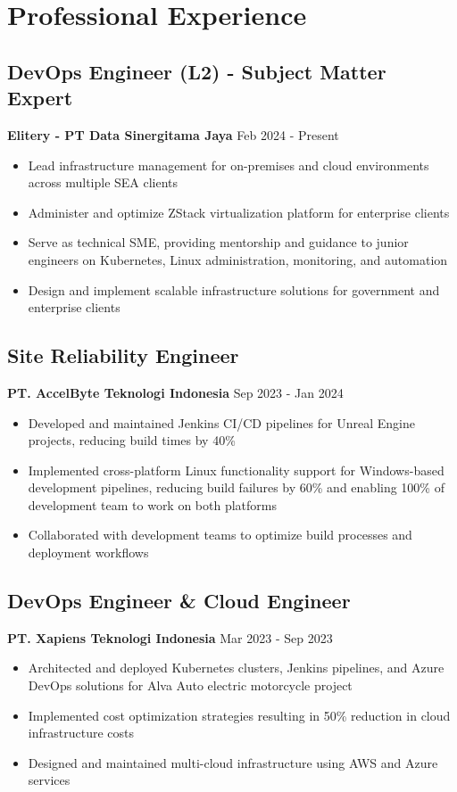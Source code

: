 \documentclass[11pt,a4paper]{article}
\newcommand{\company}[1]{\textbf{\color{primary}#1}}
\newcommand{\daterange}[1]{\color{secondary}#1}  %
\begin{document}
\section{Professional Experience}

\subsection{DevOps Engineer (L2) - Subject Matter Expert}
\company{Elitery - PT Data Sinergitama Jaya} \hfill \daterange{Feb 2024 - Present}
\begin{itemize}[leftmargin=*, itemsep=2pt]
    \item Lead infrastructure management for on-premises and cloud environments across multiple SEA clients
    \item Administer and optimize ZStack virtualization platform for enterprise clients
    \item Serve as technical SME, providing mentorship and guidance to junior engineers on Kubernetes, Linux administration, monitoring, and automation
    \item Design and implement scalable infrastructure solutions for government and enterprise clients
\end{itemize}

\subsection{Site Reliability Engineer}
\company{PT. AccelByte Teknologi Indonesia} \hfill \daterange{Sep 2023 - Jan 2024}
\begin{itemize}[leftmargin=*, itemsep=2pt]
    \item Developed and maintained Jenkins CI/CD pipelines for Unreal Engine projects, reducing build times by 40\%
            \item Implemented cross-platform Linux functionality support for Windows-based development pipelines, reducing build failures by 60\% and enabling 100\% of development team to work on both platforms
    \item Collaborated with development teams to optimize build processes and deployment workflows
\end{itemize}

\subsection{DevOps Engineer \& Cloud Engineer}
\company{PT. Xapiens Teknologi Indonesia} \hfill \daterange{Mar 2023 - Sep 2023}
\begin{itemize}[leftmargin=*, itemsep=2pt]
    \item Architected and deployed Kubernetes clusters, Jenkins pipelines, and Azure DevOps solutions for Alva Auto electric motorcycle project
    \item Implemented cost optimization strategies resulting in 50\% reduction in cloud infrastructure costs
    \item Designed and maintained multi-cloud infrastructure using AWS and Azure services
\end{itemize}
\end{document}

